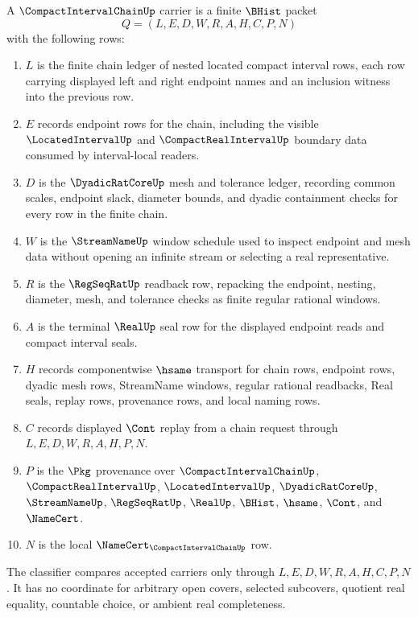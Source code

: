 \begin{definition}
\label{def:compact-interval-chain-carrier}
A $\CompactIntervalChainUp$ carrier is a finite $\BHist$ packet
$$
Q=(L,E,D,W,R,A,H,C,P,N)
$$
with the following rows:
\begin{enumerate}
\item $L$ is the finite chain ledger of nested located compact interval rows, each row carrying displayed left and right endpoint names and an inclusion witness into the previous row.
\item $E$ records endpoint rows for the chain, including the visible $\LocatedIntervalUp$ and $\CompactRealIntervalUp$ boundary data consumed by interval-local readers.
\item $D$ is the $\DyadicRatCoreUp$ mesh and tolerance ledger, recording common scales, endpoint slack, diameter bounds, and dyadic containment checks for every row in the finite chain.
\item $W$ is the $\StreamNameUp$ window schedule used to inspect endpoint and mesh data without opening an infinite stream or selecting a real representative.
\item $R$ is the $\RegSeqRatUp$ readback row, repacking the endpoint, nesting, diameter, mesh, and tolerance checks as finite regular rational windows.
\item $A$ is the terminal $\RealUp$ seal row for the displayed endpoint reads and compact interval seals.
\item $H$ records componentwise $\hsame$ transport for chain rows, endpoint rows, dyadic mesh rows, StreamName windows, regular rational readbacks, Real seals, replay rows, provenance rows, and local naming rows.
\item $C$ records displayed $\Cont$ replay from a chain request through $L,E,D,W,R,A,H,P,N$.
\item $P$ is the $\Pkg$ provenance over $\CompactIntervalChainUp$, $\CompactRealIntervalUp$, $\LocatedIntervalUp$, $\DyadicRatCoreUp$, $\StreamNameUp$, $\RegSeqRatUp$, $\RealUp$, $\BHist$, $\hsame$, $\Cont$, and $\NameCert$.
\item $N$ is the local $\NameCert_{\CompactIntervalChainUp}$ row.
\end{enumerate}
The classifier compares accepted carriers only through $L,E,D,W,R,A,H,C,P,N$. It has no coordinate for arbitrary open covers, selected subcovers, quotient real equality, countable choice, or ambient real completeness.
\end{definition}

